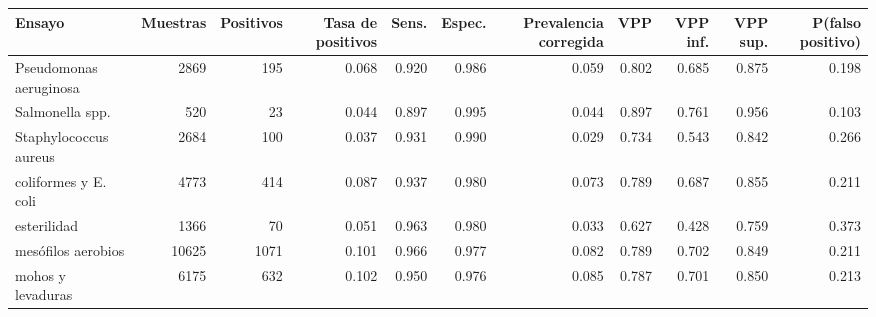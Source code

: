 \begin{tabular}{lrrrrrrrrrr}
\toprule
Ensayo & Muestras & Positivos & Tasa de positivos & Sens. & Espec. & Prevalencia corregida & VPP & VPP inf. & VPP sup. & P(falso positivo) \\
\midrule
Pseudomonas aeruginosa & 2869 & 195 & 0.068 & 0.920 & 0.986 & 0.059 & 0.802 & 0.685 & 0.875 & 0.198 \\
Salmonella spp. & 520 & 23 & 0.044 & 0.897 & 0.995 & 0.044 & 0.897 & 0.761 & 0.956 & 0.103 \\
Staphylococcus aureus & 2684 & 100 & 0.037 & 0.931 & 0.990 & 0.029 & 0.734 & 0.543 & 0.842 & 0.266 \\
coliformes y E. coli & 4773 & 414 & 0.087 & 0.937 & 0.980 & 0.073 & 0.789 & 0.687 & 0.855 & 0.211 \\
esterilidad & 1366 & 70 & 0.051 & 0.963 & 0.980 & 0.033 & 0.627 & 0.428 & 0.759 & 0.373 \\
mesófilos aerobios & 10625 & 1071 & 0.101 & 0.966 & 0.977 & 0.082 & 0.789 & 0.702 & 0.849 & 0.211 \\
mohos y levaduras & 6175 & 632 & 0.102 & 0.950 & 0.976 & 0.085 & 0.787 & 0.701 & 0.850 & 0.213 \\
\bottomrule
\end{tabular}
